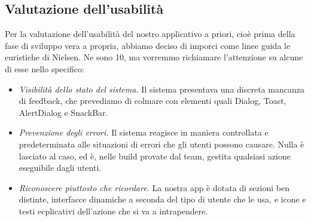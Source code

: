 \subsection{Valutazione dell'usabilità}

    \begin{flushleft}
       Per la valutazione dell'usabilità del nostro applicativo a priori, cioè prima della fase di sviluppo vera a propria,
       abbiamo deciso di imporci come linee guida le euristiche di Nielsen.
       Ne sono 10, ma vorremmo richiamare l'attenzione su alcune di esse nello specifico:
        \begin{itemize}
            \item \textit{Visibilità dello stato del sistema.} Il sistema presentava una discreta mancanza di feedback, che prevediamo di colmare con elementi quali Dialog, Toast, AlertDialog e SnackBar.
            \item \textit{Prevenzione degli errori.} Il sistema reagisce in maniera controllata e predeterminata alle situazioni di errori che gli utenti possono causare. Nulla è lasciato al caso, ed è, nelle build provate dal team, gestita qualsiasi azione eseguibile dagli utenti.
            \item \textit{Riconoscere piuttosto che ricordare.} La nostra app è dotata di sezioni ben distinte, interfacce dinamiche a seconda del tipo di utente che le usa, e icone e testi ecplicativi dell'azione che si va a intrapendere.
        \end{itemize}
    \end{flushleft}